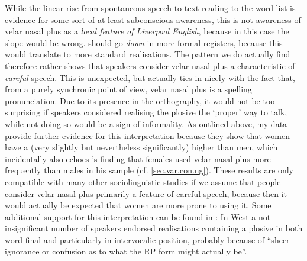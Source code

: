 While the linear rise from spontaneous speech to text reading to the word list is evidence for some sort of at least subconscious awareness, this is not awareness of velar nasal plus as a \emph{local feature of Liverpool English}, because in this case the slope would be wrong.
 should go \emph{down} in more formal registers, because this would translate to more standard realisations.
The pattern we do actually find therefore rather shows that speakers consider velar nasal plus a characteristic of \emph{careful} speech.
This is unexpected, but actually ties in nicely with the fact that, from a purely synchronic point of view, velar nasal plus is a spelling pronunciation.
Due to its presence in the orthography, it would not be too surprising if speakers considered realising the plosive the `proper' way to talk, while not doing so would be a sign of informality.
As outlined above, my data provide further evidence for this interpretation because they show that women have a (very slightly but nevertheless significantly) higher  than men, which incidentally also echoes \textcite{knowles1973}'s finding that females used velar nasal plus more frequently than males in his sample (cf. \ref{sec.var.con.ng}).
These results are only compatible with many other sociolinguistic studies if we assume that people consider velar nasal plus primarily a feature of careful speech, because then it would actually be expected that women are more prone to using it.
Some additional support for this interpretation can be found in \textcite[cf.][101]{newbrook1999}: In West  a not insignificant number of speakers endorsed realisations containing a plosive in both word-final and particularly in intervocalic position, probably because of ``sheer ignorance or confusion as to what the RP form might actually be''.

